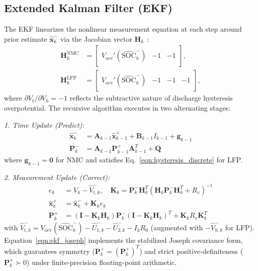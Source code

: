 \documentclass[balance,nocopyright,upint,varvw,hyphenate,barcolor=NavyBlue,nolists]{asmejour}
\begin{document}
\subsection{Extended Kalman Filter (EKF)}
The EKF linearizes the nonlinear measurement equation at each step around prior estimate $\hat{\mathbf{x}}_k^-$ via the Jacobian vector $\mathbf{H}_k$~\cite{Plett2004part3}:
\begin{align}\label{eqn:ekf_jacobian}
\mathbf{H}_k^{\text{NMC}} &= \begin{bmatrix} V_{\text{ocv}}'(\widehat{\text{SOC}}_k^-) & -1 & -1 \end{bmatrix}, \nonumber\\
\mathbf{H}_k^{\text{LFP}} &= \begin{bmatrix} V_{\text{ocv}}'(\widehat{\text{SOC}}_k^-) & -1 & -1 & -1 \end{bmatrix},
\end{align}
where $\partial V_t / \partial V_h = -1$ reflects the subtractive nature of discharge hysteresis overpotential. The recursive algorithm executes in two alternating stages:

\emph{1. Time Update (Predict):}
\begin{align}
\hat{\mathbf{x}}_k^- &= \mathbf{A}_{k-1} \hat{\mathbf{x}}_{k-1}^+ + \mathbf{B}_{k-1} I_{k-1} + \mathbf{g}_{k-1} \label{eqn:ekf_pred_state}\\
\mathbf{P}_k^- &= \mathbf{A}_{k-1} \mathbf{P}_{k-1}^+ \mathbf{A}_{k-1}^T + \mathbf{Q} \label{eqn:ekf_pred_cov}
\end{align}
where $\mathbf{g}_{k-1} = \mathbf{0}$ for NMC and satisfies Eq.~\eqref{eqn:hysteresis_discrete} for LFP.

\emph{2. Measurement Update (Correct):}
\begin{align}
e_k &= V_k - \hat{V}_{t,k}^-, \quad \mathbf{K}_k = \mathbf{P}_k^- \mathbf{H}_k^T \left( \mathbf{H}_k \mathbf{P}_k^- \mathbf{H}_k^T + R_v \right)^{-1} \label{eqn:ekf_gain}\\
\hat{\mathbf{x}}_k^+ &= \hat{\mathbf{x}}_k^- + \mathbf{K}_k e_k \label{eqn:ekf_upd_state}\\
\mathbf{P}_k^+ &= (\mathbf{I} - \mathbf{K}_k \mathbf{H}_k) \mathbf{P}_k^- (\mathbf{I} - \mathbf{K}_k \mathbf{H}_k)^T + \mathbf{K}_k R_v \mathbf{K}_k^T \label{eqn:ekf_joseph}
\end{align}
with $\hat{V}_{t,k}^- = V_{\text{ocv}}(\widehat{\text{SOC}}_k^-) - \hat{U}_{1,k}^- - \hat{U}_{2,k}^- - I_k R_0$ (augmented with $-\hat{V}_{h,k}^-$ for LFP). Equation~\eqref{eqn:ekf_joseph} implements the stabilized Joseph covariance form, which guarantees symmetry ($\mathbf{P}_k^+ = (\mathbf{P}_k^+)^T$) and strict positive-definiteness ($\mathbf{P}_k^+ \succ 0$) under finite-precision floating-point arithmetic.
\end{document}
